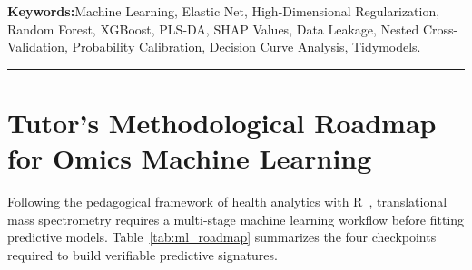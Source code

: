 \documentclass[11pt,oneside]{book}
\begin{document}
\noindent
\textbf{Keywords:}\enspace Machine Learning, Elastic Net, High-Dimensional Regularization, Random Forest, XGBoost, PLS-DA, SHAP Values, Data Leakage, Nested Cross-Validation, Probability Calibration, Decision Curve Analysis, Tidymodels.

\vspace{0.8em}
\noindent\rule{\textwidth}{0.4pt}

\section{Tutor's Methodological Roadmap for Omics Machine Learning}

Following the pedagogical framework of health analytics with R~\cite{boland2023health}, translational mass spectrometry requires a multi-stage machine learning workflow before fitting predictive models. Table~\ref{tab:ml_roadmap} summarizes the four checkpoints required to build verifiable predictive signatures.
\end{document}
